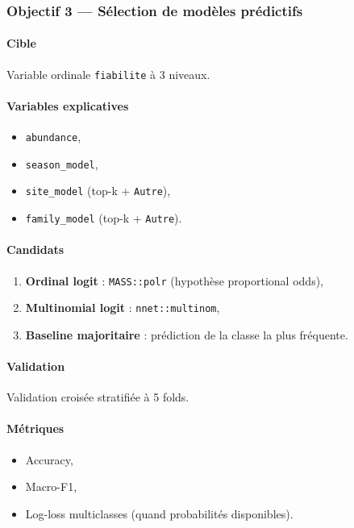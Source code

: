 \documentclass[11pt,a4paper]{article}
\begin{document}
\subsubsection{Objectif 3 --- Sélection de modèles prédictifs}
\paragraph{Cible}
Variable ordinale \texttt{fiabilite} à 3 niveaux.

\paragraph{Variables explicatives}
\begin{itemize}[leftmargin=1.2cm]
  \item \texttt{abundance},
  \item \texttt{season\_model},
  \item \texttt{site\_model} (top-k + \texttt{Autre}),
  \item \texttt{family\_model} (top-k + \texttt{Autre}).
\end{itemize}

\paragraph{Candidats}
\begin{enumerate}[leftmargin=1.2cm]
  \item \textbf{Ordinal logit} : \texttt{MASS::polr} (hypothèse proportional odds),
  \item \textbf{Multinomial logit} : \texttt{nnet::multinom},
  \item \textbf{Baseline majoritaire} : prédiction de la classe la plus fréquente.
\end{enumerate}

\paragraph{Validation}
Validation croisée stratifiée à 5 folds.

\paragraph{Métriques}
\begin{itemize}[leftmargin=1.2cm]
  \item Accuracy,
  \item Macro-F1,
  \item Log-loss multiclasses (quand probabilités disponibles).
\end{itemize}
\end{document}
